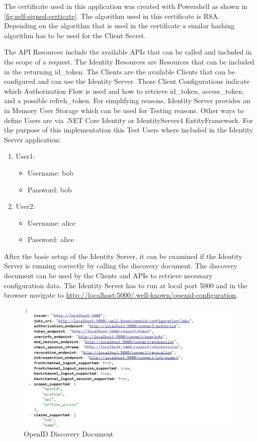 The certificate used in this application was created with Powershell as shown in \ref{fig:self-signed-certicate}. The algorithm used in this certificate is RSA. Depending on the algorithm that is used in the certificate a similar hashing algorithm has to be used for the Client Secret.


The API Resources include the available APIs that can be called and included in the scope of a request. The Identity Resources are Resources that can be included in the returning id\_token. The Clients are the available Clients that can be configured and can use the Identity Server. Those Client Configurations indicate which Authorization Flow is used and how to retrieve id\_token, access\_token, and a possible refreh\_token. For simplifying reasons, Identity Server provides an in Memory User Storage which can be used for Testing reasons. Other ways to define Users are via .NET Core Identity or IdentityServer4 EntityFramework. For the purpose of this implementation this Test Users where included in the Identity Server application:
\begin{enumerate}
	\item User1:
	\begin{itemize}
		\item  Username: bob
		\item  Password: bob
	\end{itemize} 
	\item User2:
	\begin{itemize}
		\item  Username: alice
		\item  Password: alice
	\end{itemize} 
\end{enumerate}

After the basic setup of the Identity Server, it can be examined if the Identity Server is running correctly by calling the discovery document. The discovery document can be used by the Clients and APIs to retrieve necessary configuration data. The Identity Server has to run at local port 5000 and in the browser navigate to
\url{http://localhost:5000/.well-known/openid-configuration}.

\begin{figure}[h]
	\centering
	\includegraphics[width=0.8\linewidth]{images/openid-discovery-document}
	\caption{OpenID Discovery Document}
	\label{fig:openid-discovery-document}
\end{figure}

